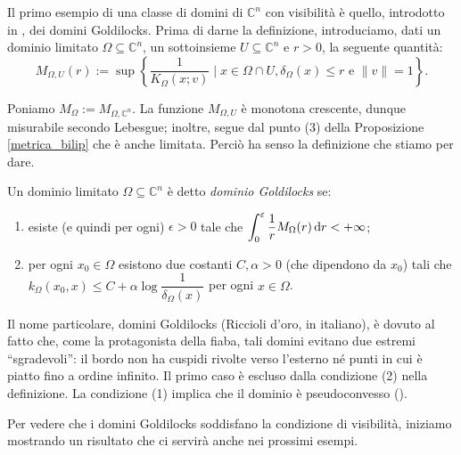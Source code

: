 Il primo esempio di una classe di domini di $\mathbb{C}^n$ con visibilità è quello, introdotto in \cite{BZ1}, dei domini Goldilocks. Prima di darne la definizione, introduciamo, dati un dominio limitato $\Omega\subseteq\mathbb{C}^n$, un sottoinsieme $U\subseteq\mathbb{C}^n$ e $r>0$, la seguente quantità:
$$M_{\Omega,U}(r):=\sup\left\{\frac{1}{K_\Omega(x;v)}\mid x\in\Omega\cap U,\delta_\Omega(x) \le r\text{ e } \|v\|=1\right\}.$$

Poniamo $M_\Omega:=M_{\Omega,\mathbb{C}^n}$. La funzione $M_{\Omega,U}$ è monotona crescente, dunque misurabile secondo Lebesgue; inoltre, segue dal punto (3) della Proposizione \ref{metrica_bilip} che è anche limitata. Perciò ha senso la definizione che stiamo per dare.

\begin{defn} \label{gold}
    Un dominio limitato $\Omega\subseteq\mathbb{C}^n$ è detto \textit{dominio Goldilocks} se:
    \begin{enumerate}[label={(\arabic*)}]
        \item esiste (e quindi per ogni) $\epsilon>0$ tale che $\displaystyle\int_0^{\varepsilon} \frac{1}{r}M_\Omega(r)\mathop{}\!\mathrm{d} r<+\infty$;
        \item per ogni $x_0\in\Omega$ esistono due costanti $C,\alpha>0$ (che dipendono da $x_0$) tali che $k_\Omega(x_0,x) \le C+\alpha\log{\dfrac{1}{\delta_\Omega(x)}}$ per ogni $x\in\Omega$.
    \end{enumerate}
\end{defn}

\begin{oss}
    Il nome particolare, domini Goldilocks (Riccioli d'oro, in italiano), è dovuto al fatto che, come la protagonista della fiaba, tali domini evitano due estremi ``sgradevoli'': il bordo non ha cuspidi rivolte verso l'esterno né punti in cui è piatto fino a ordine infinito. Il primo caso è escluso dalla condizione (2) nella definizione. La condizione (1) implica che il dominio è pseudoconvesso (\cite[Proposition 2.15]{BZ1}).
\end{oss}

Per vedere che i domini Goldilocks soddisfano la condizione di visibilità, iniziamo mostrando un risultato che ci servirà anche nei prossimi esempi.

